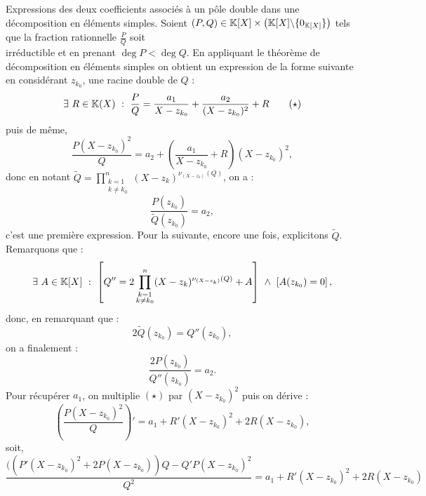 \documentclass{article}
\begin{document}
    \begin{question_kholle}
        []
        {Expressions des deux coefficients associés à un pôle double dans une décomposition en éléments simples.}
        Soient $(P, Q) \in \mathbb K [X] \times \left( \mathbb K [X] \backslash \{ 0_{\mathbb K[X] }\} \right) $ tels que la fraction rationnelle $\frac{P}{Q}$ soit \\ irréductible et en prenant $\deg P < \deg Q$. En appliquant le théorème de décomposition en éléments simples on obtient un expression de la forme suivante en considérant $z_{k_0}$, une racine double de $Q$ : 
        \[
            \exists \ R \in \mathbb K (X) \ : \ \frac{P}{Q} = \frac{a_1}{X - z_{k_0}}  + \frac{a_2}{(X - z_{k_0})^2} + R \quad \quad (\star)  
        \]
        puis de même, 
        \[
            \frac{P(X - z_{k_0})^2}{Q} = a_2  + \left( \frac{a_1}{X - z_{k_0}} + R \right)(X - z_{k_0})^2,
        \]
        donc en notant $\widetilde{Q} = \displaystyle \prod_{\substack{k=1 \\ k\neq k_0}}^n(X-z_k)^{\nu_{(X-z_k)}(Q)}$, on a : 
        \[
            \frac{P(z_{k_0})}{\widetilde{Q}(z_{k_0})} = a_2, 
        \]
        c'est une première expression. Pour la suivante, encore une fois, explicitons $\widetilde{Q}$. Remarquons que :
        \[
            \exists \ A \in \mathbb K [X] \ : \ \left[ Q'' = 2\prod_{\substack{k=1 \\ k \neq k_0}}^n (X-z_k)^{\nu_{(X-z_k)}(Q)} + A \right] \ \wedge \ \left[ A(z_{k_0} ) = 0 \right],
        \]
        donc, en remarquant que : 
        \[
            2\widetilde{Q}(z_{k_0}) = Q''(z_{k_0}),
        \]
        on a finalement : 
        \[
            \frac{2P(z_{k_0})}{Q''(z_{k_0})} = a_2.
        \]
        Pour récupérer $a_1$, on multiplie $(\star )$ par $(X- z_{k_0})^2$ puis on dérive : 
        \[
            \left( \frac{P  ( X - z_{k_0})^2}{Q}\right)' =  a_1 + R'(X-z_{k_0})^2 + 2R(X - z_{k_0}),
        \]
        soit, 
        \[
            \frac{((P'(X - z_{k_0})^2 + 2P(X-z_{k_0}))Q - Q'P(X-z_{k_0})^2 }{Q^2}  = a_1 + R'(X-z_{k_0})^2 + 2R(X - z_{k_0})
        \]
    \end{question_kholle}
    
\end{document}

